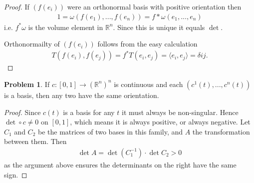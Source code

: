 \documentclass[20pt]{article}
\theoremstyle{plain}
\theoremstyle{definition}
\newtheorem*{problem}{Problem}
\newcommand{\reals}{\mathbb{R}}
\begin{document}
\begin{proof}
  If $(f(e_i))$ were an orthonormal basis with positive orientation then
  \begin{align*}
    1 = \omega( f(e_1), ..., f(e_n) ) = f*\omega(e_1, ..., e_n)
  \end{align*}
  i.e. $f^*\omega$ is the volume element in $\reals^n$.  Since this is unique it equals $\det$.

  Orthonormailty of $(f(e_i))$ follows from the easy calculation
  \begin{align*}
    T(f(e_i), f(e_j)) = f^*T(e_i, e_j) = \langle e_i, e_j \rangle = \delta{ij}.
  \end{align*}
\end{proof}




\begin{problem}{4.5}
    If $c: [0, 1] \to (\reals^n)^n$ is continuous and each $(c^1(t), ..., c^n(t))$ is a basis,
    then any two have the same orientation.
\end{problem}

\begin{proof}
  Since $c(t)$ is a basis for any $t$ it must always be non-singular.
  Hence $\det \circ c \neq 0$ on $[0, 1]$, which means it is always
  positive, or always negative.
  Let $C_1$ and $C_2$ be the matrices of two bases in this family, and $A$ the transformation between them.
  Then
  \begin{align*}
    \det A = \det(C^{-1}_1) \cdot \det C_2 > 0
  \end{align*}
  as the argument above ensures the determinants on the right have the same sign.
\end{proof}
\end{document}
